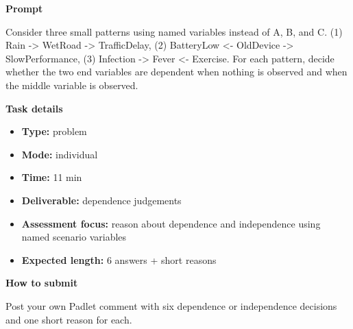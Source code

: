 \documentclass[11pt]{article}
\begin{document}
\begin{tcolorbox}[colback=white,colframe=MidnightBlue,title={Q2 Structured Problem},fonttitle=\bfseries,breakable]
\begin{center}
\end{center}

{\large\bfseries\color{MidnightBlue} Prompt}\par\medskip
Consider three small patterns using named variables instead of A, B, and C. (1) Rain -\textgreater{} WetRoad -\textgreater{} TrafficDelay, (2) BatteryLow \textless- OldDevice -\textgreater{} SlowPerformance, (3) Infection -\textgreater{} Fever \textless- Exercise. For each pattern, decide whether the two end variables are dependent when nothing is observed and when the middle variable is observed.

{\large\bfseries\color{MidnightBlue} Task details}\par\medskip
\begin{itemize}\item \textbf{Type:} problem
\item \textbf{Mode:} individual
\item \textbf{Time:} 11 min
\item \textbf{Deliverable:} dependence judgements
\item \textbf{Assessment focus:} reason about dependence and independence using named scenario variables
\item \textbf{Expected length:} 6 answers + short reasons\end{itemize}

{\large\bfseries\color{MidnightBlue} How to submit}\par\medskip
Post your own Padlet comment with six dependence or independence decisions and one short reason for each.


\end{tcolorbox}
\end{document}
